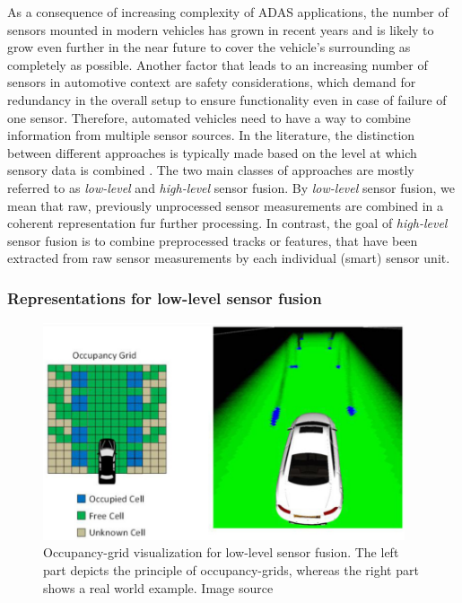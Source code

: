 As a consequence of increasing complexity of \ac{ADAS} applications, the number of sensors mounted in modern vehicles has grown in recent years and is likely to grow even further in the near future to cover the vehicle's surrounding as completely as possible.
Another factor that leads to an increasing number of sensors in automotive context are safety considerations, which demand for redundancy in the overall setup to ensure functionality even in case of failure of one sensor.
Therefore, automated vehicles need to have a way to combine information from multiple sensor sources.
In the literature, the distinction between different approaches is typically made based on the level at which sensory data is combined \cite{Elfring2016}.
The two main classes of approaches are mostly referred to as \emph{low-level} and \emph{high-level} sensor fusion.
By \emph{low-level} sensor fusion, we mean that raw, previously unprocessed sensor measurements are combined in a coherent representation fur further processing.
In contrast, the goal of \emph{high-level} sensor fusion is to combine preprocessed tracks or features, that have been extracted from raw sensor measurements by each individual (smart) sensor unit.

\subsubsection{Representations for low-level sensor fusion}

\begin{figure}[t!]
	\centering
	\includegraphics[width=0.95\textwidth]{imgs/occupancy_grid_principle.png}
    \caption{Occupancy-grid visualization for low-level sensor fusion. The left part depicts the principle of occupancy-grids, whereas the right part shows a real world example. Image source \cite{Hohm2014}}
	\label{fig:occupancy-grid}
\end{figure}

